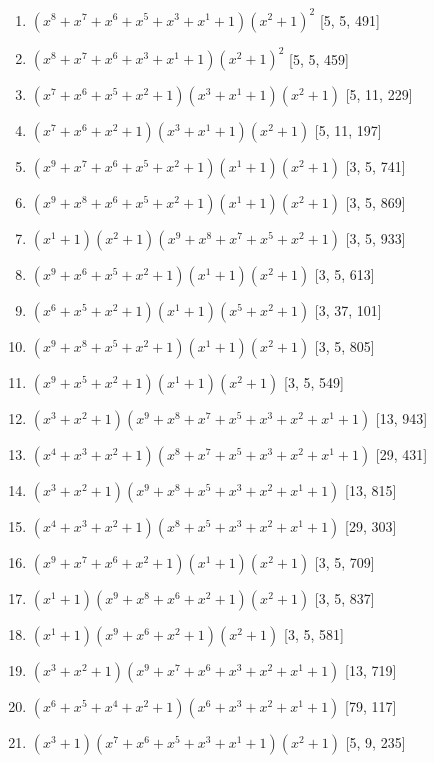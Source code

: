 \documentclass[10pt,twocolumn]{article}
\begin{document}
\begin{enumerate}
\item $(x^{8} + x^{7} + x^{6} + x^{5} + x^{3} + x^{1} + 1)(x^{2} + 1)^{2}$  [5, 5, 491]
\item $(x^{8} + x^{7} + x^{6} + x^{3} + x^{1} + 1)(x^{2} + 1)^{2}$  [5, 5, 459]
\item $(x^{7} + x^{6} + x^{5} + x^{2} + 1)(x^{3} + x^{1} + 1)(x^{2} + 1)$  [5, 11, 229]
\item $(x^{7} + x^{6} + x^{2} + 1)(x^{3} + x^{1} + 1)(x^{2} + 1)$  [5, 11, 197]
\item $(x^{9} + x^{7} + x^{6} + x^{5} + x^{2} + 1)(x^{1} + 1)(x^{2} + 1)$  [3, 5, 741]
\item $(x^{9} + x^{8} + x^{6} + x^{5} + x^{2} + 1)(x^{1} + 1)(x^{2} + 1)$  [3, 5, 869]
\item $(x^{1} + 1)(x^{2} + 1)(x^{9} + x^{8} + x^{7} + x^{5} + x^{2} + 1)$  [3, 5, 933]
\item $(x^{9} + x^{6} + x^{5} + x^{2} + 1)(x^{1} + 1)(x^{2} + 1)$  [3, 5, 613]
\item $(x^{6} + x^{5} + x^{2} + 1)(x^{1} + 1)(x^{5} + x^{2} + 1)$  [3, 37, 101]
\item $(x^{9} + x^{8} + x^{5} + x^{2} + 1)(x^{1} + 1)(x^{2} + 1)$  [3, 5, 805]
\item $(x^{9} + x^{5} + x^{2} + 1)(x^{1} + 1)(x^{2} + 1)$  [3, 5, 549]
\item $(x^{3} + x^{2} + 1)(x^{9} + x^{8} + x^{7} + x^{5} + x^{3} + x^{2} + x^{1} + 1)$  [13, 943]
\item $(x^{4} + x^{3} + x^{2} + 1)(x^{8} + x^{7} + x^{5} + x^{3} + x^{2} + x^{1} + 1)$  [29, 431]
\item $(x^{3} + x^{2} + 1)(x^{9} + x^{8} + x^{5} + x^{3} + x^{2} + x^{1} + 1)$  [13, 815]
\item $(x^{4} + x^{3} + x^{2} + 1)(x^{8} + x^{5} + x^{3} + x^{2} + x^{1} + 1)$  [29, 303]
\item $(x^{9} + x^{7} + x^{6} + x^{2} + 1)(x^{1} + 1)(x^{2} + 1)$  [3, 5, 709]
\item $(x^{1} + 1)(x^{9} + x^{8} + x^{6} + x^{2} + 1)(x^{2} + 1)$  [3, 5, 837]
\item $(x^{1} + 1)(x^{9} + x^{6} + x^{2} + 1)(x^{2} + 1)$  [3, 5, 581]
\item $(x^{3} + x^{2} + 1)(x^{9} + x^{7} + x^{6} + x^{3} + x^{2} + x^{1} + 1)$  [13, 719]
\item $(x^{6} + x^{5} + x^{4} + x^{2} + 1)(x^{6} + x^{3} + x^{2} + x^{1} + 1)$  [79, 117]
\item $(x^{3} + 1)(x^{7} + x^{6} + x^{5} + x^{3} + x^{1} + 1)(x^{2} + 1)$  [5, 9, 235]

\end{enumerate}
\end{document}
